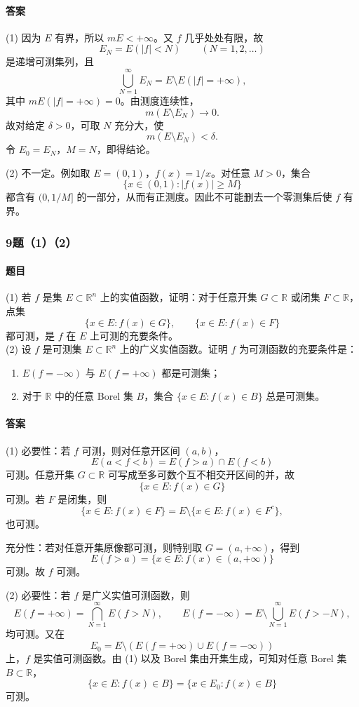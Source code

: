 \documentclass{article}
\begin{document}
\paragraph{答案} (1) 因为 $E$ 有界，所以 $mE<+\infty$。又 $f$ 几乎处处有限，故
\[
 E_N=E(|f|<N)\qquad(N=1,2,\ldots)
\]
是递增可测集列，且
\[
 \bigcup_{N=1}^{\infty}E_N=E\setminus E(|f|=+\infty),
\]
其中 $mE(|f|=+\infty)=0$。由测度连续性，
\[
 m(E\setminus E_N)\to0.
\]
故对给定 $\delta>0$，可取 $N$ 充分大，使
\[
 m(E\setminus E_N)<\delta.
\]
令 $E_0=E_N$，$M=N$，即得结论。

(2) 不一定。例如取 $E=(0,1)$，$f(x)=1/x$。对任意 $M>0$，集合
\[
 \{x\in(0,1):|f(x)|\ge M\}
\]
都含有 $(0,1/M]$ 的一部分，从而有正测度。因此不可能删去一个零测集后使 $f$ 有界。

\subsubsection*{9题（1）（2）}
\paragraph{题目} (1) 若 $f$ 是集 $E\subset\mathbb{R}^n$ 上的实值函数，证明：对于任意开集 $G\subset\mathbb{R}$ 或闭集 $F\subset\mathbb{R}$，点集
\[
 \{x\in E:f(x)\in G\},\qquad \{x\in E:f(x)\in F\}
\]
都可测，是 $f$ 在 $E$ 上可测的充要条件。\\
(2) 设 $f$ 是可测集 $E\subset\mathbb{R}^n$ 上的广义实值函数。证明 $f$ 为可测函数的充要条件是：
\begin{enumerate}[label=(\roman*)]
\item $E(f=-\infty)$ 与 $E(f=+\infty)$ 都是可测集；
\item 对于 $\mathbb{R}$ 中的任意 Borel 集 $B$，集合 $\{x\in E:f(x)\in B\}$ 总是可测集。
\end{enumerate}

\paragraph{答案} (1) 必要性：若 $f$ 可测，则对任意开区间 $(a,b)$，
\[
 E(a<f<b)=E(f>a)\cap E(f<b)
\]
可测。任意开集 $G\subset\mathbb{R}$ 可写成至多可数个互不相交开区间的并，故
\[
 \{x\in E:f(x)\in G\}
\]
可测。若 $F$ 是闭集，则
\[
 \{x\in E:f(x)\in F\}=E\setminus\{x\in E:f(x)\in F^c\},
\]
也可测。

充分性：若对任意开集原像都可测，则特别取 $G=(a,+\infty)$，得到
\[
 E(f>a)=\{x\in E:f(x)\in(a,+\infty)
\}
\]
可测。故 $f$ 可测。

(2) 必要性：若 $f$ 是广义实值可测函数，则
\[
 E(f=+\infty)=\bigcap_{N=1}^{\infty}E(f>N),
\qquad
E(f=-\infty)=E\setminus\bigcup_{N=1}^{\infty}E(f>-N),
\]
均可测。又在
\[
 E_0=E\setminus(E(f=+\infty)\cup E(f=-\infty))
\]
上，$f$ 是实值可测函数。由 (1) 以及 Borel 集由开集生成，可知对任意 Borel 集 $B\subset\mathbb{R}$，
\[
 \{x\in E:f(x)\in B\}=\{x\in E_0:f(x)\in B\}
\]
可测。
\end{document}

